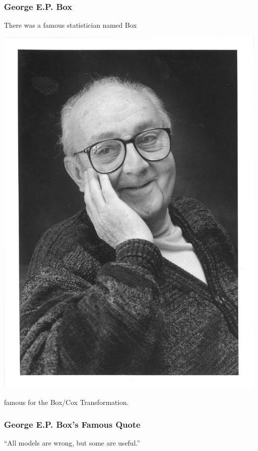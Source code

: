 \documentclass[handout]{beamer}
\newcommand{\blue}[1]{\textcolor{blue2}{#1}}
\begin{document}
\begin{frame}[fragile]
\frametitle{George E.P. Box}
There was a famous statistician named Box
\begin{center}
\includegraphics[height=0.5\textheight]{figure/GeorgeEPBox.jpg}
\end{center}
famous for the Box/Cox Transformation.  
\end{frame}


\begin{frame}[fragile]
\frametitle{George E.P. Box's Famous Quote}

\blue{``All models are wrong, but some are useful.''}

\end{frame}
\end{document}
